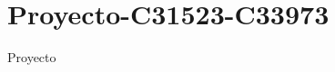 \chapter{Proyecto-\/\+C31523-\/\+C33973}
\label{md__r_e_a_d_m_e}
\label{md__r_e_a_d_m_e_autotoc_md0}%


Proyecto 